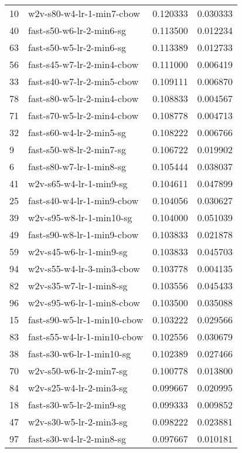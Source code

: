 {\begin{tabular}{llrr}
10 &    w2v-s80-w4-lr-1-min7-cbow &  0.120333 &  0.030333 \\
40 &     fast-s50-w6-lr-2-min6-sg &  0.113500 &  0.012234 \\
63 &     fast-s50-w5-lr-2-min6-sg &  0.113389 &  0.012733 \\
56 &   fast-s45-w7-lr-2-min4-cbow &  0.111000 &  0.006419 \\
33 &   fast-s40-w7-lr-2-min5-cbow &  0.109111 &  0.006870 \\
78 &   fast-s80-w5-lr-2-min4-cbow &  0.108833 &  0.004567 \\
71 &   fast-s70-w5-lr-2-min4-cbow &  0.108778 &  0.004713 \\
32 &     fast-s60-w4-lr-2-min5-sg &  0.108222 &  0.006766 \\
9  &     fast-s50-w8-lr-2-min7-sg &  0.106722 &  0.019902 \\
6  &     fast-s80-w7-lr-1-min8-sg &  0.105444 &  0.038037 \\
41 &      w2v-s65-w4-lr-1-min9-sg &  0.104611 &  0.047899 \\
25 &   fast-s40-w4-lr-1-min9-cbow &  0.104056 &  0.030627 \\
39 &     w2v-s95-w8-lr-1-min10-sg &  0.104000 &  0.051039 \\
49 &   fast-s90-w8-lr-1-min9-cbow &  0.103833 &  0.021878 \\
59 &      w2v-s45-w6-lr-1-min9-sg &  0.103833 &  0.045703 \\
94 &    w2v-s55-w4-lr-3-min3-cbow &  0.103778 &  0.004135 \\
82 &      w2v-s35-w7-lr-1-min8-sg &  0.103556 &  0.045433 \\
96 &    w2v-s95-w6-lr-1-min8-cbow &  0.103500 &  0.035088 \\
15 &  fast-s90-w5-lr-1-min10-cbow &  0.103222 &  0.029566 \\
83 &  fast-s55-w4-lr-1-min10-cbow &  0.102556 &  0.030679 \\
38 &    fast-s30-w6-lr-1-min10-sg &  0.102389 &  0.027466 \\
70 &      w2v-s50-w6-lr-2-min7-sg &  0.100778 &  0.013800 \\
84 &      w2v-s25-w4-lr-2-min3-sg &  0.099667 &  0.020995 \\
18 &     fast-s30-w5-lr-2-min9-sg &  0.099333 &  0.009852 \\
47 &      w2v-s30-w5-lr-2-min3-sg &  0.098222 &  0.023881 \\
97 &     fast-s30-w4-lr-2-min8-sg &  0.097667 &  0.010181 \\

\end{tabular}}
